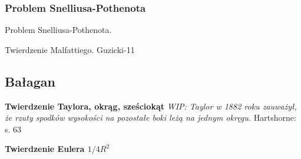 \subsubsection{Problem Snelliusa-Pothenota}
Problem Snelliusa-Pothenota.
%


Twierdzenie Malfattiego.
Guzicki-11

\subsection{Bałagan}

\textbf{Twierdzenie Taylora, okrąg, sześciokąt}
{
    \emph{WIP: Taylor w 1882 roku zauważył, że rzuty spodków wysokości na pozostałe boki leżą na jednym okręgu.}
	Hartshorne: s. 63
}

\textbf{Twierdzenie Eulera $1/4R^2$}



%